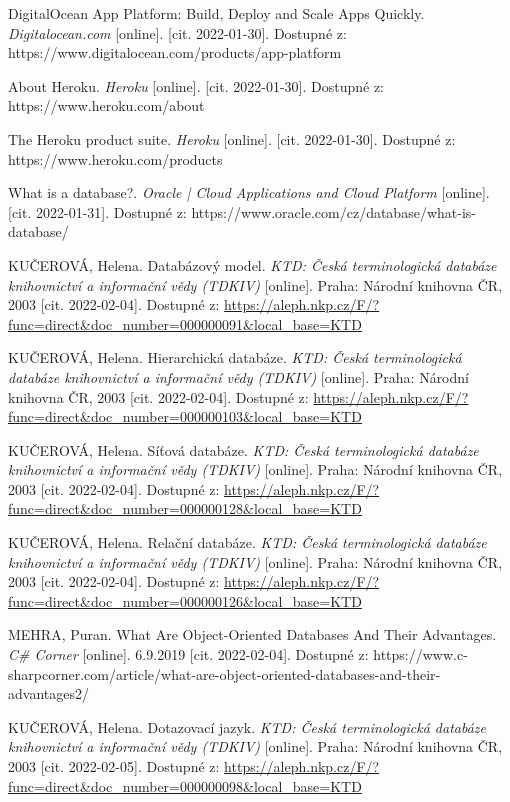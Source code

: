 \begin{thebibliography}{32}
DigitalOcean App Platform: Build, Deploy and Scale Apps Quickly. \textit{Digitalocean.com} [online]. [cit. 2022-01-30]. Dostupné z: https://www.digitalocean.com/products/app-platform

About Heroku. \textit{Heroku} [online]. [cit. 2022-01-30]. Dostupné z: https://www.heroku.com/about

The Heroku product suite. \textit{Heroku} [online]. [cit. 2022-01-30]. Dostupné z: https://www.heroku.com/products

What is a database?. \textit{Oracle | Cloud Applications and Cloud Platform} [online]. [cit. 2022-01-31]. Dostupné z: https://www.oracle.com/cz/database/what-is-database/

KUČEROVÁ, Helena. Databázový model. \textit{KTD: Česká terminologická databáze knihovnictví a informační vědy (TDKIV)} [online]. Praha: Národní knihovna ČR, 2003 [cit. 2022-02-04]. Dostupné z: \url{https://aleph.nkp.cz/F/?func=direct&doc\_number=000000091&local\_base=KTD}

KUČEROVÁ, Helena. Hierarchická databáze. \textit{KTD: Česká terminologická databáze knihovnictví a informační vědy (TDKIV)} [online]. Praha: Národní knihovna ČR, 2003 [cit. 2022-02-04]. Dostupné z: \url{https://aleph.nkp.cz/F/?func=direct&doc\_number=000000103&local\_base=KTD}

KUČEROVÁ, Helena. Síťová databáze. \textit{KTD: Česká terminologická databáze knihovnictví a informační vědy (TDKIV)} [online]. Praha: Národní knihovna ČR, 2003 [cit. 2022-02-04]. Dostupné z: \url{https://aleph.nkp.cz/F/?func=direct&doc\_number=000000128&local\_base=KTD}

KUČEROVÁ, Helena. Relační databáze. \textit{KTD: Česká terminologická databáze knihovnictví a informační vědy (TDKIV)} [online]. Praha: Národní knihovna ČR, 2003 [cit. 2022-02-04]. Dostupné z: \url{https://aleph.nkp.cz/F/?func=direct&doc\_number=000000126&local\_base=KTD}

MEHRA, Puran. What Are Object-Oriented Databases And Their Advantages. \textit{C\# Corner} [online]. 6.9.2019 [cit. 2022-02-04]. Dostupné z: https://www.c-sharpcorner.com/article/what-are-object-oriented-databases-and-their-advantages2/

KUČEROVÁ, Helena. Dotazovací jazyk. \textit{KTD: Česká terminologická databáze knihovnictví a informační vědy (TDKIV)} [online]. Praha: Národní knihovna ČR, 2003 [cit. 2022-02-05]. Dostupné z: \url{https://aleph.nkp.cz/F/?func=direct&doc\_number=000000098&local\_base=KTD}


\end{thebibliography}
